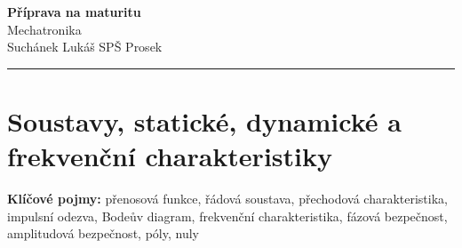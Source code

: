 \documentclass[a4paper,10pt]{article}
\begin{document}
\begin{minipage}[t]{0.75\textwidth}
    {\Huge\bfseries\color{accent} Příprava na maturitu}\\[4pt]
    {\large\color{stripeblue} Mechatronika}\\[2pt]
    \textcolor{medgray}{\small Suchánek Lukáš \quad SPŠ Prosek }
\end{minipage}
\hfill
\begin{minipage}[t]{0.22\textwidth}
    \raggedleft
\end{minipage}

\vspace{6pt}
\noindent\color{accent}\rule{\linewidth}{1.5pt}
\vspace{2pt}

\section{Soustavy, statické, dynamické a frekvenční charakteristiky}

\begin{pojmybox}
\textbf{Klíčové pojmy:}
přenosová funkce, řádová soustava, přechodová charakteristika,
impulsní odezva, Bodeův diagram, frekvenční charakteristika,
fázová bezpečnost, amplitudová bezpečnost, póly, nuly
\end{pojmybox}
\end{document}
